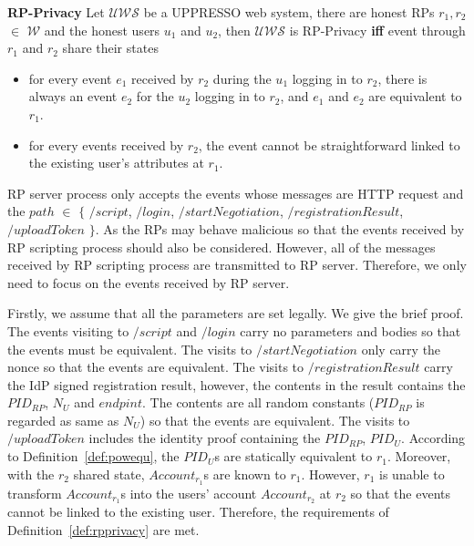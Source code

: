 \begin{definition}
\vspace{1mm}\noindent\textbf{RP-Privacy} Let  $\mathcal{UWS}$ be a UPPRESSO web system, there are honest RPs $r_1, r_2$ $\in$ $\mathcal{W}$ and the honest users $u_1$ and $u_2$, then $\mathcal{UWS}$ is RP-Privacy \textbf{iff} event through $r_1$ and $r_2$ share their states
\begin{itemize}
\item for every event $e_1$ received by $r_2$ during the $u_1$ logging in to $r_2$, there is always an event $e_2$ for the $u_2$ logging in to $r_2$, and $e_1$ and $e_2$ are equivalent to $r_1$.
\item for every events received by $r_2$, the event cannot be straightforward linked to the existing user's attributes at $r_1$.
\end{itemize}
\label{def:rpprivacy}
\end{definition}
RP server process only accepts the events whose messages are HTTP request and the $path$ $\in$ $\{$ $/script$, $/login$, $/startNegotiation$,  $/registrationResult$, $/uploadToken$ $\}$.
As the RPs may behave malicious so that the events received by RP scripting process should also be considered. However, all of the messages received by RP scripting process are transmitted to RP server. Therefore, we only need to focus on the events received by RP server. 

Firstly, we assume that all the parameters are set legally. We give the brief proof. The events visiting to $/script$ and $/login$ carry no parameters and bodies so that the events must be equivalent. The visits to  $/startNegotiation$ only carry the nonce so that the events are equivalent. The visits to  $/registrationResult$ carry the IdP signed registration result, however, the contents in the result  contains the $PID_{RP}$, $N_U$ and $endpint$. The contents are all random constants ($PID_{RP}$ is regarded as same as $N_U$) so that the events are equivalent. The visits to  $/uploadToken$ includes the identity proof containing the $PID_{RP}$, $PID_U$. According to Definition~\ref{def:powequ}, the $PID_U$s are statically equivalent to $r_1$.  Moreover, with the $r_2$ shared state, $Account_{r_1}$s are known to $r_1$. However, $r_1$ is unable to transform $Account_{r_1}$s into the users' account $Account_{r_2}$ at $r_2$  so that the events cannot be linked to the existing user. Therefore, the requirements of  Definition~\ref{def:rpprivacy}  are met.

